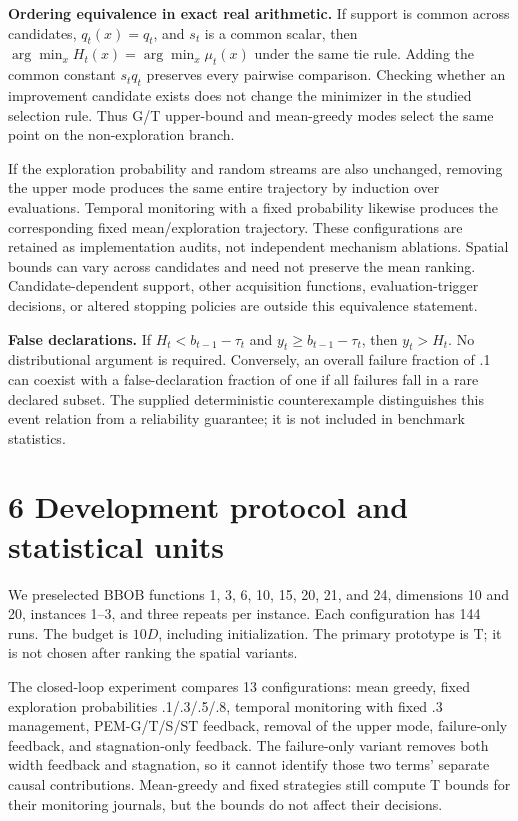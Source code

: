 \documentclass[11pt,a4paper]{article}
\begin{document}
\textbf{Ordering equivalence in exact real arithmetic.} If support is
common across candidates, \(q_t(x)=q_t\), and \(s_t\) is a common
scalar, then \(\arg\min_xH_t(x)=\arg\min_x\mu_t(x)\) under the same tie
rule. Adding the common constant \(s_tq_t\) preserves every pairwise
comparison. Checking whether an improvement candidate exists does not
change the minimizer in the studied selection rule. Thus G/T upper-bound
and mean-greedy modes select the same point on the non-exploration
branch.

If the exploration probability and random streams are also unchanged,
removing the upper mode produces the same entire trajectory by induction
over evaluations. Temporal monitoring with a fixed probability likewise
produces the corresponding fixed mean/exploration trajectory. These
configurations are retained as implementation audits, not independent
mechanism ablations. Spatial bounds can vary across candidates and need
not preserve the mean ranking. Candidate-dependent support, other
acquisition functions, evaluation-trigger decisions, or altered stopping
policies are outside this equivalence statement.

\textbf{False declarations.} If \(H_t<b_{t-1}-\tau_t\) and
\(y_t\ge b_{t-1}-\tau_t\), then \(y_t>H_t\). No distributional argument
is required. Conversely, an overall failure fraction of .1 can coexist
with a false-declaration fraction of one if all failures fall in a rare
declared subset. The supplied deterministic counterexample distinguishes
this event relation from a reliability guarantee; it is not included in
benchmark statistics.

\hypertarget{development-protocol-and-statistical-units}{%
\section{6 Development protocol and statistical
units}\label{development-protocol-and-statistical-units}}

We preselected BBOB functions 1, 3, 6, 10, 15, 20, 21, and 24,
dimensions 10 and 20, instances 1--3, and three repeats per instance.
Each configuration has 144 runs. The budget is \(10D\), including
initialization. The primary prototype is T; it is not chosen after
ranking the spatial variants.

The closed-loop experiment compares 13 configurations: mean greedy,
fixed exploration probabilities .1/.3/.5/.8, temporal monitoring with
fixed .3 management, PEM-G/T/S/ST feedback, removal of the upper mode,
failure-only feedback, and stagnation-only feedback. The failure-only
variant removes both width feedback and stagnation, so it cannot
identify those two terms' separate causal contributions. Mean-greedy and
fixed strategies still compute T bounds for their monitoring journals,
but the bounds do not affect their decisions.
\end{document}

